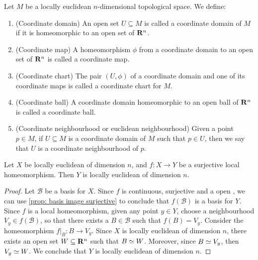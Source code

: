 \begin{definition}[Miscelaneous]
  Let \(M\) be a locally euclidean \(n\)-dimensional topological space. We
  define:
  \begin{enumerate}[(C1)]
    \item\label{def: coordinate domain}
      (Coordinate domain) An open set \(U \subseteq M\) is called a coordinate
      domain of \(M\) if it is homeomorphic to an open set of \(\mathbf{R}^n\).
    \item\label{def: coordinate map}
      (Coordinate map) A homeomorphism \(\phi\) from a coordinate domain to an
      open set of \(\mathbf{R}^n\) is called a coordinate map.
    \item\label{def: coordinate chart}
      (Coordinate chart) The pair \((U, \phi)\) of a coordinate domain and one
      of its coordinate maps is called a coordinate chart for \(M\).
    \item\label{def: coordinate ball}
      (Coordinate ball) A coordinate domain homeomorphic to an open ball of
      \(\mathbf{R}^n\) is called a coordinate ball.
    \item\label{def: euclidean neighbourhood}
      (Coordinate neighbourhood or euclidean neighbourhood) Given a point \(p
      \in M\), if \(U \subseteq M\) is a coordinate domain of \(M\) such that
      \(p \in U\), then we say that \(U\) is a coordinate neighbourhood of
      \(p\).
  \end{enumerate}
\end{definition}

\begin{proposition}
  Let \(X\) be locally euclidean of dimension \(n\), and \(f: X \to Y\) be a
  surjective local homeomorphism. Then \(Y\) is locally euclidean of dimension
  \(n\).
\end{proposition}

\begin{proof}
  Let \(\mathcal B\) be a basis for \(X\). Since \(f\) is continuous, surjective
  and a open , we can use \cref{prop: basis image
  surjective} to conclude that \(f(\mathcal B)\) is a basis for \(Y\). Since
  \(f\) is a local homeomorphism, given any point \(y \in Y\), choose a
  neighbourhood \(V_y \in f(\mathcal B)\), so that there exists a \(B \in
  \mathcal B\) such that \(f(B) = V_y\). Consider the homeomorphism \(f|_B: B
  \to V_y\). Since \(X\) is locally euclidean of dimension \(n\), there exists
  an open set \(W \subseteq \mathbf{R}^n\) such that \(B \simeq W\). Moreover,
  since \(B \simeq V_y\), then \(V_y \simeq W\). We conclude that \(Y\) is locally
  euclidean of dimension \(n\).
\end{proof}

